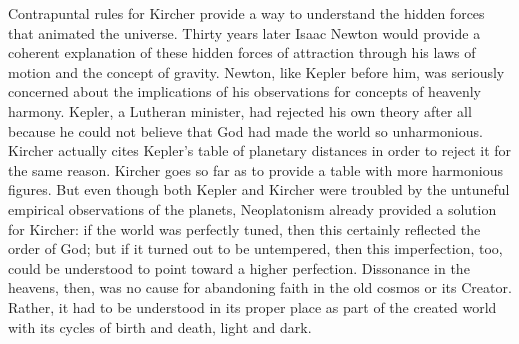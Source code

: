 Contrapuntal rules for Kircher provide a way to understand the hidden forces
that animated the universe.%
    \citXXX[Gouk et al]
Thirty years later Isaac Newton would provide a coherent explanation of these
hidden forces of attraction through his laws of motion and the concept of
gravity.
Newton, like Kepler before him, was seriously concerned about the implications
of his observations for concepts of heavenly harmony.
Kepler, a Lutheran minister, had rejected his own theory after all because he
could not believe that God had made the world so unharmonious.%
    \citXXX[Hawking?]
Kircher actually cites Kepler's table of planetary distances in order to
reject it for the same reason.%
    \citXXX[Kircher]
Kircher goes so far as to provide a  table with more
harmonious figures.
But even though both Kepler and Kircher were troubled by the untuneful empirical
observations of the planets, Neoplatonism already provided a solution for
Kircher: if the world was perfectly tuned, then this certainly reflected the
order of God; but if it turned out to be untempered, then this imperfection,
too, could be understood to point toward a higher perfection.
Dissonance in the heavens, then, was no cause for abandoning faith in the old
cosmos or its Creator.
Rather, it had to be understood in its proper place as part of the created world
with its cycles of birth and death, light and dark.

